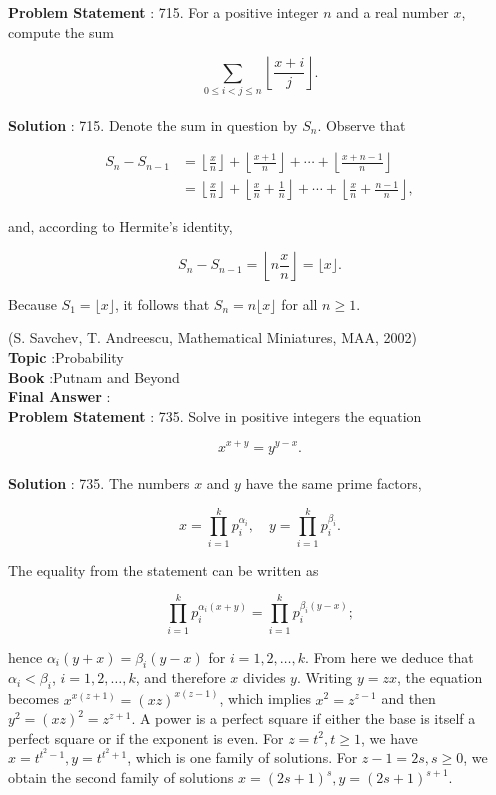 \documentclass[10pt]{article}
\begin{document}
\textbf{Problem Statement} :
715. For a positive integer $n$ and a real number $x$, compute the sum

$$
\sum_{0 \leq i<j \leq n}\left\lfloor\frac{x+i}{j}\right\rfloor .
$$
\\
\textbf{Solution} :
715. Denote the sum in question by $S_{n}$. Observe that

$$
\begin{aligned}
S_{n}-S_{n-1} &=\left\lfloor\frac{x}{n}\right\rfloor+\left\lfloor\frac{x+1}{n}\right\rfloor+\cdots+\left\lfloor\frac{x+n-1}{n}\right\rfloor \\
&=\left\lfloor\frac{x}{n}\right\rfloor+\left\lfloor\frac{x}{n}+\frac{1}{n}\right\rfloor+\cdots+\left\lfloor\frac{x}{n}+\frac{n-1}{n}\right\rfloor,
\end{aligned}
$$

and, according to Hermite's identity,

$$
S_{n}-S_{n-1}=\left\lfloor n \frac{x}{n}\right\rfloor=\lfloor x\rfloor .
$$

Because $S_{1}=\lfloor x\rfloor$, it follows that $S_{n}=n\lfloor x\rfloor$ for all $n \geq 1$.

(S. Savchev, T. Andreescu, Mathematical Miniatures, MAA, 2002)
\\
\textbf{Topic} :Probability\\
\textbf{Book} :Putnam and Beyond\\
\textbf{Final Answer} :\\


\textbf{Problem Statement} :
735. Solve in positive integers the equation

$$
x^{x+y}=y^{y-x} .
$$
\\
\textbf{Solution} :
735. The numbers $x$ and $y$ have the same prime factors,

$$
x=\prod_{i=1}^{k} p_{i}^{\alpha_{i}}, \quad y=\prod_{i=1}^{k} p_{i}^{\beta_{i}} .
$$

The equality from the statement can be written as

$$
\prod_{i=1}^{k} p_{i}^{\alpha_{i}(x+y)}=\prod_{i=1}^{k} p_{i}^{\beta_{i}(y-x)} ;
$$

hence $\alpha_{i}(y+x)=\beta_{i}(y-x)$ for $i=1,2, \ldots, k$. From here we deduce that $\alpha_{i}<\beta_{i}$, $i=1,2, \ldots, k$, and therefore $x$ divides $y$. Writing $y=z x$, the equation becomes $x^{x(z+1)}=(x z)^{x(z-1)}$, which implies $x^{2}=z^{z-1}$ and then $y^{2}=(x z)^{2}=z^{z+1}$. A power is a perfect square if either the base is itself a perfect square or if the exponent is even. For $z=t^{2}, t \geq 1$, we have $x=t^{t^{2}-1}, y=t^{t^{2}+1}$, which is one family of solutions. For $z-1=2 s, s \geq 0$, we obtain the second family of solutions $x=(2 s+1)^{s}, y=(2 s+1)^{s+1}$.
\end{document}
